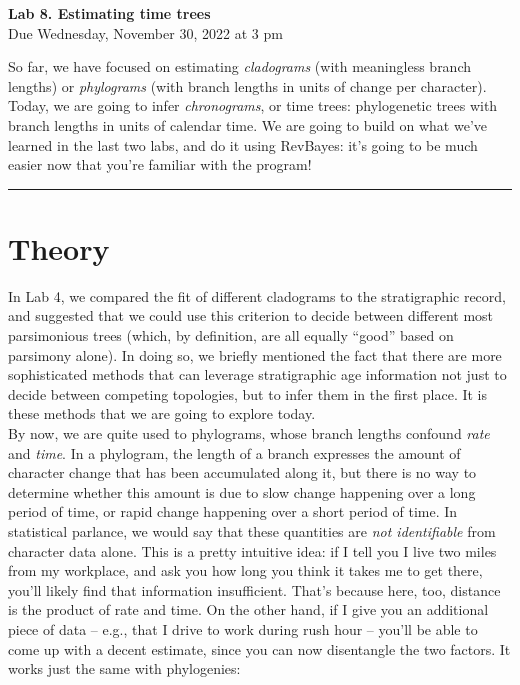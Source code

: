 \documentclass[12pt]{article}
\begin{document}
\frenchspacing

\begin{center}
{\Large \textbf{Lab 8. Estimating time trees}} \\[0.5cm]
{\large Due Wednesday, November 30, 2022 at 3 pm}
\end{center}

\vspace{1cm}

\noindent So far, we have focused on estimating \textit{cladograms} (with meaningless branch lengths) or \textit{phylograms} (with branch lengths in units of change per character). Today, we are going to infer \textit{chronograms}, or time trees: phylogenetic trees with branch lengths in units of calendar time. We are going to build on what we've learned in the last two labs, and do it using RevBayes: it's going to be much easier now that you're familiar with the program! \\

\hrule

\section*{Theory}

In Lab 4, we compared the fit of different cladograms to the stratigraphic record, and suggested that we could use this criterion to decide between different most parsimonious trees (which, by definition, are all equally ``good'' based on parsimony alone). In doing so, we briefly mentioned the fact that there are more sophisticated methods that can leverage stratigraphic age information not just to decide between competing topologies, but to infer them in the first place. It is these methods that we are going to explore today. \\

\noindent By now, we are quite used to phylograms, whose branch lengths confound \textit{rate} and \textit{time}. In a phylogram, the length of a branch expresses the amount of character change that has been accumulated along it, but there is no way to determine whether this amount is due to slow change happening over a long period of time, or rapid change happening over a short period of time. In statistical parlance, we would say that these quantities are \textit{not identifiable} from character data alone. This is a pretty intuitive idea: if I tell you I live two miles from my workplace, and ask you how long you think it takes me to get there, you'll likely find that information insufficient. That's because here, too, distance is the product of rate and time. On the other hand, if I give you an additional piece of data -- e.g., that I drive to work during rush hour -- you'll be able to come up with a decent estimate, since you can now disentangle the two factors. It works just the same with phylogenies: \\
\end{document}
